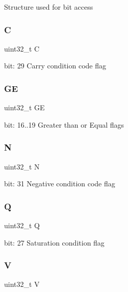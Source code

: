Structure used for bit access \mbox{\label{union_a_p_s_r___type_a7a1caf92f32fe9ebd8d1fe89b06c7776}} 
\subsubsection{\texorpdfstring{C}{C}}
{\footnotesize\ttfamily uint32\+\_\+t C}

bit\+: 29 Carry condition code flag \mbox{\label{union_a_p_s_r___type_aa91800ec6e90e457c7a1acd1f2e17099}} 
\subsubsection{\texorpdfstring{GE}{GE}}
{\footnotesize\ttfamily uint32\+\_\+t GE}

bit\+: 16..19 Greater than or Equal flags \mbox{\label{union_a_p_s_r___type_abae0610bc2a97bbf7f689e953e0b451f}} 
\subsubsection{\texorpdfstring{N}{N}}
{\footnotesize\ttfamily uint32\+\_\+t N}

bit\+: 31 Negative condition code flag \mbox{\label{union_a_p_s_r___type_a65f27ddc4f7e09c14ce7c5211b2e000a}} 
\subsubsection{\texorpdfstring{Q}{Q}}
{\footnotesize\ttfamily uint32\+\_\+t Q}

bit\+: 27 Saturation condition flag \mbox{\label{union_a_p_s_r___type_acd4a2b64faee91e4a9eef300667fa222}} 
\subsubsection{\texorpdfstring{V}{V}}
{\footnotesize\ttfamily uint32\+\_\+t V}

